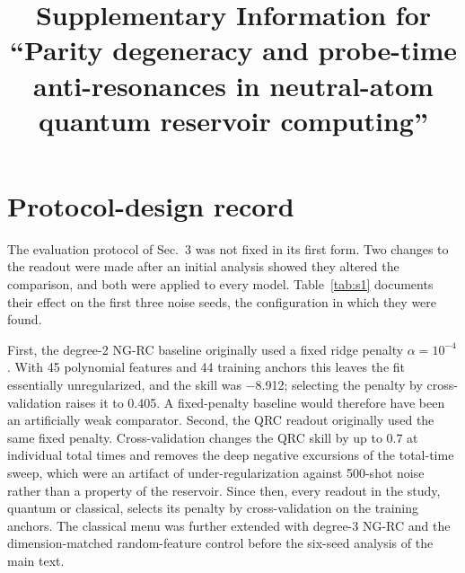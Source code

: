 \documentclass[pdflatex,sn-mathphys-num]{sn-jnl}
\begin{document}
\title[Supplementary Information]{Supplementary Information for ``Parity degeneracy and probe-time anti-resonances in neutral-atom quantum reservoir computing''}
\author*[1]{ }
\author[1]{ }
\author[1]{ }
\author[2]{ }
\maketitle

\section{Protocol-design record}\label{sec:s1}

The evaluation protocol of Sec.~3 was not fixed in its first form. Two changes to the readout were made after an initial analysis showed they altered the comparison, and both were applied to every model. Table~\ref{tab:s1} documents their effect on the first three noise seeds, the configuration in which they were found.

First, the degree-2 NG-RC baseline originally used a fixed ridge penalty $\alpha=10^{-4}$. With 45 polynomial features and 44 training anchors this leaves the fit essentially unregularized, and the skill was $-$8.912; selecting the penalty by cross-validation raises it to 0.405. A fixed-penalty baseline would therefore have been an artificially weak comparator. Second, the QRC readout originally used the same fixed penalty. Cross-validation changes the QRC skill by up to $0.7$ at individual total times and removes the deep negative excursions of the total-time sweep, which were an artifact of under-regularization against 500-shot noise rather than a property of the reservoir. Since then, every readout in the study, quantum or classical, selects its penalty by cross-validation on the training anchors. The classical menu was further extended with degree-3 NG-RC and the dimension-matched random-feature control before the six-seed analysis of the main text.
\end{document}
